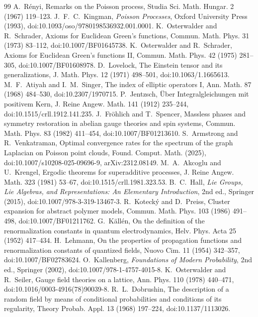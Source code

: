 \begin{thebibliography}{99}
 A.~R\'enyi, Remarks on the Poisson process, Studia Sci. Math. Hungar. 2 (1967) 119--123.
 J.~F.~C.~Kingman, \emph{Poisson Processes}, Oxford University Press (1993), doi:10.1093/oso/9780198536932.001.0001.
 K.~Osterwalder and R.~Schrader, Axioms for Euclidean Green's functions, Commun. Math. Phys. 31 (1973) 83--112, doi:10.1007/BF01645738.
 K.~Osterwalder and R.~Schrader, Axioms for Euclidean Green's functions II, Commun. Math. Phys. 42 (1975) 281--305, doi:10.1007/BF01608978.
 D.~Lovelock, The Einstein tensor and its generalizations, J. Math. Phys. 12 (1971) 498--501, doi:10.1063/1.1665613.
 M.~F.~Atiyah and I.~M.~Singer, The index of elliptic operators I, Ann. Math. 87 (1968) 484--530, doi:10.2307/1970715.
 P.~Jentzsch, \"Uber Integralgleichungen mit positivem Kern, J. Reine Angew. Math. 141 (1912) 235--244, doi:10.1515/crll.1912.141.235.
 J.~Fr\"ohlich and T.~Spencer, Massless phases and symmetry restoration in abelian gauge theories and spin systems, Commun. Math. Phys. 83 (1982) 411--454, doi:10.1007/BF01213610.
 S.~Armstrong and R.~Venkatraman, Optimal convergence rates for the spectrum of the graph Laplacian on Poisson point clouds, Found. Comput. Math. (2025), doi:10.1007/s10208-025-09696-9, arXiv:2312.08149.
 M.~A.~Akcoglu and U.~Krengel, Ergodic theorems for superadditive processes, J. Reine Angew. Math. 323 (1981) 53--67, doi:10.1515/crll.1981.323.53.
 B.~C.~Hall, \emph{Lie Groups, Lie Algebras, and Representations: An Elementary Introduction}, 2nd ed., Springer (2015), doi:10.1007/978-3-319-13467-3.
 R.~Koteck\'y and D.~Preiss, Cluster expansion for abstract polymer models, Commun. Math. Phys. 103 (1986) 491--498, doi:10.1007/BF01211762.
 G.~K\"all\'en, On the definition of the renormalization constants in quantum electrodynamics, Helv. Phys. Acta 25 (1952) 417--434.
 H.~Lehmann, On the properties of propagation functions and renormalization constants of quantized fields, Nuovo Cim. 11 (1954) 342--357, doi:10.1007/BF02783624.
 O.~Kallenberg, \emph{Foundations of Modern Probability}, 2nd ed., Springer (2002), doi:10.1007/978-1-4757-4015-8.
 K.~Osterwalder and R.~Seiler, Gauge field theories on a lattice, Ann. Phys. 110 (1978) 440--471, doi:10.1016/0003-4916(78)90039-8.
 R.~L.~Dobrushin, The description of a random field by means of conditional probabilities and conditions of its regularity, Theory Probab. Appl. 13 (1968) 197--224, doi:10.1137/1113026.

\end{thebibliography}
